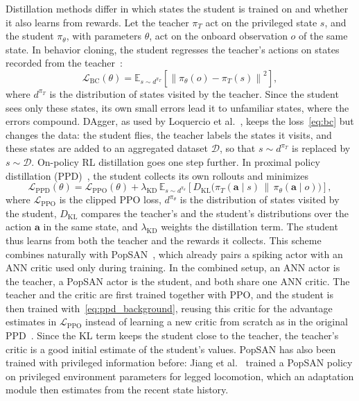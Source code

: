 Distillation methods differ in which states the student is trained on and whether it also learns from rewards. Let the teacher $\pi_T$ act on the privileged state $s$, and the student $\pi_\theta$, with parameters $\theta$, act on the onboard observation $o$ of the same state. In behavior cloning, the student regresses the teacher's actions on states recorded from the teacher~\cite{stroobantsNeuromorphicAttitudeEstimation2025}:
\begin{equation}
    \mathcal{L}_{\mathrm{BC}}(\theta) = \mathbb{E}_{s \sim d^{\pi_T}}\left[\left\lVert \pi_\theta(o) - \pi_T(s) \right\rVert^2\right],
    \label{eq:bc}
\end{equation}
where $d^{\pi_T}$ is the distribution of states visited by the teacher. Since the student sees only these states, its own small errors lead it to unfamiliar states, where the errors compound. DAgger, as used by Loquercio et al.~\cite{loquercioLearningHighSpeedFlight2021}, keeps the loss~\eqref{eq:bc} but changes the data: the student flies, the teacher labels the states it visits, and these states are added to an aggregated dataset $\mathcal{D}$, so that $s \sim d^{\pi_T}$ is replaced by $s \sim \mathcal{D}$. On-policy RL distillation goes one step further. In proximal policy distillation (PPD)~\cite{spiglerProximalPolicyDistillation2025}, the student collects its own rollouts and minimizes
\begin{equation}
    \mathcal{L}_{\mathrm{PPD}}(\theta) = \mathcal{L}_{\mathrm{PPO}}(\theta) + \lambda_{\mathrm{KD}}\, \mathbb{E}_{s \sim d^{\pi_\theta}}\left[D_{\mathrm{KL}}\big(\pi_T(\mathbf{a} \mid s) \,\big\|\, \pi_\theta(\mathbf{a} \mid o)\big)\right],
    \label{eq:ppd_background}
\end{equation}
where $\mathcal{L}_{\mathrm{PPO}}$ is the clipped PPO loss, $d^{\pi_\theta}$ is the distribution of states visited by the student, $D_{\mathrm{KL}}$ compares the teacher's and the student's distributions over the action $\mathbf{a}$ in the same state, and $\lambda_{\mathrm{KD}}$ weights the distillation term. The student thus learns from both the teacher and the rewards it collects. This scheme combines naturally with PopSAN~\cite{tangDeepReinforcementLearning2020}, which already pairs a spiking actor with an ANN critic used only during training. In the combined setup, an ANN actor is the teacher, a PopSAN actor is the student, and both share one ANN critic. The teacher and the critic are first trained together with PPO, and the student is then trained with~\eqref{eq:ppd_background}, reusing this critic for the advantage estimates in $\mathcal{L}_{\mathrm{PPO}}$ instead of learning a new critic from scratch as in the original PPD~\cite{spiglerProximalPolicyDistillation2025}. Since the KL term keeps the student close to the teacher, the teacher's critic is a good initial estimate of the student's values. PopSAN has also been trained with privileged information before: Jiang et al.~\cite{jiangFullySpikingNeural2024} trained a PopSAN policy on privileged environment parameters for legged locomotion, which an adaptation module then estimates from the recent state history.

